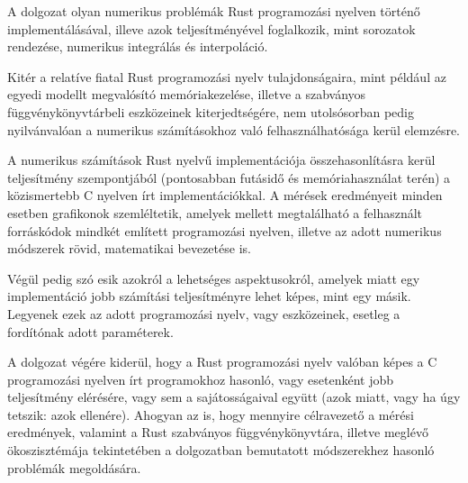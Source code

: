 
A dolgozat olyan numerikus problémák Rust programozási nyelven történő implementálásával, illeve azok teljesítményével foglalkozik, mint sorozatok rendezése, numerikus integrálás és interpoláció.

Kitér a relatíve fiatal Rust programozási nyelv tulajdonságaira, mint például az egyedi modellt megvalósító memóriakezelése, illetve a szabványos függvénykönyvtárbeli eszközeinek kiterjedtségére, nem utolsósorban pedig nyilvánvalóan a numerikus számításokhoz való felhasználhatósága kerül elemzésre.

A numerikus számítások Rust nyelvű implementációja összehasonlításra kerül teljesítmény szempontjából (pontosabban futásidő és memóriahasználat terén) a közismertebb C nyelven írt implementációkkal. A mérések eredményeit minden esetben grafikonok szemléltetik, amelyek mellett megtalálható a felhasznált forráskódok mindkét említett programozási nyelven, illetve az adott numerikus módszerek rövid, matematikai bevezetése is.

Végül pedig szó esik azokról a lehetséges aspektusokról, amelyek miatt egy implementáció jobb számítási teljesítményre lehet képes, mint egy másik. Legyenek ezek az adott programozási nyelv, vagy eszközeinek, esetleg a fordítónak adott paraméterek.

A dolgozat végére kiderül, hogy a Rust programozási nyelv valóban képes a C programozási nyelven írt programokhoz hasonló, vagy esetenként jobb teljesítmény elérésére, vagy sem a sajátosságaival együtt (azok miatt, vagy ha úgy tetszik: azok ellenére). Ahogyan az is, hogy mennyire célravezető a mérési eredmények, valamint a Rust szabványos függvénykönyvtára, illetve meglévő ökoszisztémája tekintetében a dolgozatban bemutatott módszerekhez hasonló problémák megoldására.

